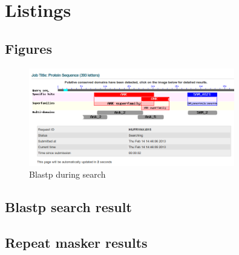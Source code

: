 \documentclass[english,11pt]{article}
\begin{document}
\section{Listings}

\subsection{Figures}
\begin{figure}[h!]
    \centering
    \caption{Blastp during search}
    \label{img:blastp.png}
    \includegraphics[width=0.8\textwidth]{blastp}
\end{figure}

\newpage

\subsection{Blastp search result}
\label{lst:fgenesh}


\subsection{Repeat masker results}
\label{lst:repeatmasker}
{\small
    {}
}
\end{document}
